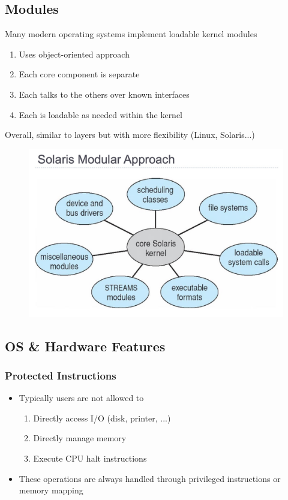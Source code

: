 \documentclass[11pt]{article}
\theoremstyle{definition}
\begin{document}
        \subsection{Modules}
        \hspace{1cm} Many modern operating systems implement loadable kernel modules
        \begin{enumerate}
            \item Uses object-oriented approach
            \item Each core component is separate
            \item Each talks to the others over known interfaces
            \item Each is loadable as needed within the kernel
        \end{enumerate}
        \hspace{1cm} Overall, similar to layers but with more flexibility (Linux, Solaris...)
        \begin{figure}[htbp]
                \centering
                \includegraphics[width=0.65\linewidth]{Operating System/img/Solaris_Modular_Approach.jpg}
                \label{fig:enter-label}
            \end{figure}
        \subsection{OS \& Hardware Features}
            \subsubsection{Protected Instructions}
                \begin{itemize}
                    \item Typically users are not allowed to
                    \begin{enumerate}
                        \item Directly access I/O (disk, printer, ...)
                        \item Directly manage memory
                        \item Execute CPU halt instructions
                    \end{enumerate}
                    \item These operations are always handled through privileged instructions or memory mapping
                \end{itemize}
            \clearpage
\end{document}
